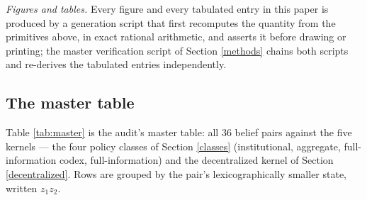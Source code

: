\documentclass[10pt,twocolumn]{article}
\theoremstyle{definition}
\begin{document}
\emph{Figures and tables.} Every figure and every tabulated entry in
this paper is produced by a generation script that first recomputes the
quantity from the primitives above, in exact rational arithmetic, and
asserts it before drawing or printing; the master verification script of
Section \ref{methods} chains both scripts and re-derives the tabulated
entries independently.

\subsection{The master table}\label{master}

Table \ref{tab:master} is the audit's master table: all 36 belief pairs
against the five kernels --- the four policy classes of Section
\ref{classes} (institutional, aggregate, full-information codex,
full-information) and the decentralized kernel of Section
\ref{decentralized}. Rows are grouped by the pair's lexicographically
smaller state, written \(z_1 z_2\).
\end{document}
